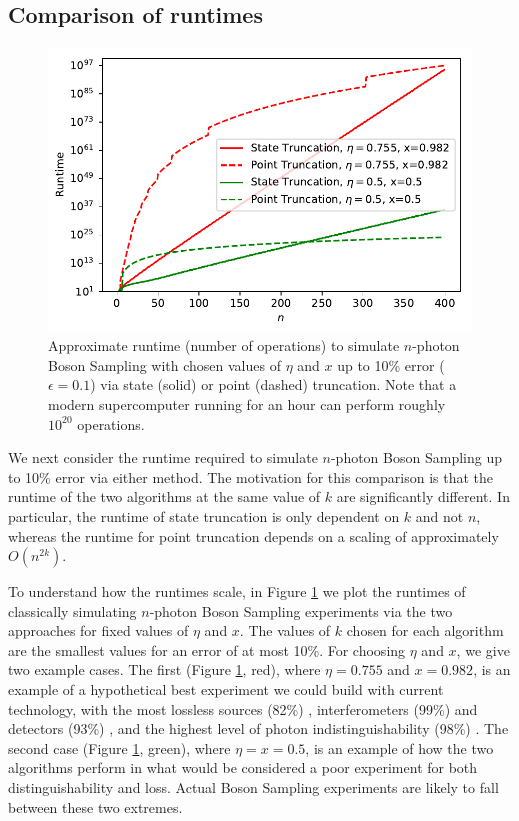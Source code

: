 \subsection{Comparison of runtimes}
\label{subsec:runtimes}

\begin{figure}
\begin{center}
\includegraphics[width=0.5\linewidth]{classical_sim/runtime}
\end{center}
\caption[Approximate runtime to simulate $n$-photon Boson Sampling with chosen values of $\eta$ and $x$ via state or point truncation]{\label{fig:runtime} Approximate runtime (number of operations) to simulate $n$-photon Boson Sampling with chosen values of $\eta$ and $x$ up to 10\% error ($\epsilon=0.1$) via state (solid) or point (dashed) truncation. Note that a modern supercomputer running for an hour can perform roughly $10^{20}$ operations.}
\end{figure}

We next consider the runtime required to simulate $n$-photon Boson Sampling up to 10\% error via either method. 
The motivation for this comparison is that the runtime of the two algorithms at the same value of $k$ are significantly different. 
In particular, the runtime of state truncation is only dependent on $k$ and not $n$, whereas the runtime for point truncation depends on a scaling of approximately $O(n^{2k})$.

To understand how the runtimes scale, in Figure \ref{fig:runtime} we plot the runtimes of classically simulating $n$-photon Boson Sampling experiments via the two approaches for fixed values of $\eta$ and $x$. 
The values of $k$ chosen for each algorithm are the smallest values for an error of at most 10\%. 
For choosing $\eta$ and $x$, we give two example cases. 
The first (Figure \ref{fig:runtime}, red), where $\eta=0.755$ and $x=0.982$, is an example of a hypothetical best experiment we could build with current technology, with the most lossless sources (82\%) \cite{slussarenko2017}, interferometers (99\%) \cite{wang2018} and detectors (93\%) \cite{marsili2013}, and the highest level of photon indistinguishability (98\%) \cite{ornelashuerta2020}. 
The second case (Figure \ref{fig:runtime}, green), where $\eta=x=0.5$, is an example of how the two algorithms perform in what would be considered a poor experiment for both distinguishability and loss. 
Actual Boson Sampling experiments are likely to fall between these two extremes.

